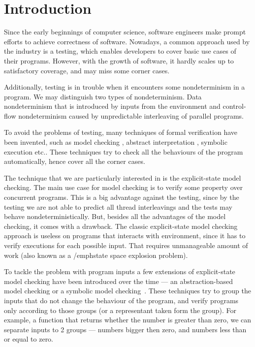 \chapter{Introduction}\label{ch:Introduction}


\noindent
Since the early beginnings of computer science, software engineers make prompt
efforts to achieve correctness of software. Nowadays, a common approach used by
the industry is a testing, which enables developers to cover basic use cases of
their programs. However, with the growth of software, it hardly scales up to
satisfactory coverage, and may miss some corner cases.

Additionally, testing is in trouble when it encounters some nondeterminism in a
program. We may distinguish two types of nondeterminism. Data nondeterminism
that is introduced by inputs from the environment and control-flow
nondeterminism caused by unpredictable interleaving of parallel
programs.

To avoid the problems of testing, many techniques of formal verification have
been invented, such as model checking \cite{Baier08}, abstract interpretation
\cite{Cousot14}, symbolic execution \cite{King76} etc.. These techniques try to
check all the behaviours of the program automatically, hence cover all the
corner cases.

The technique that we are particularly interested in is the explicit-state model
checking.  The main use case for model checking is to verify
some property over concurrent programs. This is a big advantage against
the testing, since by the testing we are not able to predict all thread
interleavings and the tests may behave nondeterministically. But,
besides all the advantages of the model checking, it comes with a
drawback. The classic explicit-state model checking approach is useless
on programs that interacts with environment, since it has to verify
executions for each possible input. That requires unmanageable amount
of work (also known as a /emph{state space explosion problem}).

To tackle the problem with program inputs a few extensions of explicit-state
model checking have been introduced over the time --- an abstraction-based model
checking \cite{Clarke94} or a symbolic model checking~\cite{Clarke96}. These
techniques try to group the inputs that do not change the behaviour of the
program, and verify programs only according to those groups (or a representant
taken form the group). For example, a function that returns whether the
number is greater than zero, we can separate inputs to 2 groups --- numbers
bigger then zero, and numbers less than or equal to zero.

